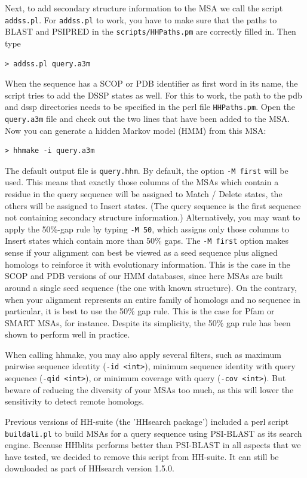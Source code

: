 \documentclass[11pt,a4paper]{article}
\begin{document}
Next, to add secondary structure information to the MSA we call the script \verb`addss.pl`. For \verb`addss.pl` to work, you have to make sure that the paths to BLAST and PSIPRED in the \verb`scripts/HHPaths.pm` are correctly filled in. Then type
\begin{verbatim}
> addss.pl query.a3m
\end{verbatim}
When the sequence has a SCOP or PDB identifier as first word in its name, the script tries to add the DSSP states as well. For this to work, the path to the pdb and dssp directories needs to be specified in the perl file \verb`HHPaths.pm`. Open the \verb`query.a3m` file and check out the two lines that have been added to the MSA. Now you can generate a hidden Markov model (HMM) from this MSA:
\begin{verbatim}
> hhmake -i query.a3m
\end{verbatim}
The default output file is \verb`query.hhm`. By default, the option \verb`-M first` will 
be used. This means that exactly those columns of 
the MSAs which contain a residue in the query sequence will be assigned to Match 
/ Delete states, the others will be assigned to Insert states. (The query sequence is 
the first sequence not containing secondary structure information.) Alternatively, you 
may want to apply the 50\%-gap rule by typing \verb`-M 50`, which assigns only those columns 
to Insert states which contain more than 50\% gaps. The \verb`-M first` option makes sense 
if your alignment can best be viewed as a seed sequence plus aligned homologs to 
reinforce it with evolutionary information. This is the case in the SCOP and PDB 
versions of our HMM databases, since here MSAs are built around a single seed 
sequence (the one with known structure). On the contrary, when your alignment 
represents an entire family of homologs and no sequence in particular, it is best to 
use the 50\% gap rule. This is the case for Pfam or SMART MSAs, for instance. 
Despite its simplicity, the 50\% gap rule has been shown to perform well in practice.

When calling hhmake, you may also apply several filters, such as maximum pairwise 
sequence identity (\verb`-id <int>`), minimum sequence identity with query sequence 
(\verb`-qid <int>`), or minimum coverage with query (\verb`-cov <int>`). But beware 
of reducing the diversity of your MSAs too much, as this will lower the sensitivity to
detect remote homologs.

Previous versions of HH-suite (the 'HHsearch package') included a perl script \verb`buildali.pl` to build MSAs for a query sequence using PSI-BLAST as its search engine. Because HHblits performs better than PSI-BLAST in all aspects that we have tested, we decided to remove this script from HH-suite. It can still be downloaded as part of HHsearch version 1.5.0.
\end{document}

